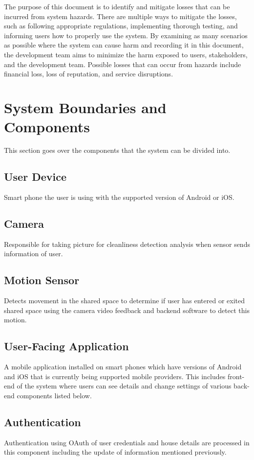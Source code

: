 \documentclass[12pt, titlepage]{article}
\begin{document}
The purpose of this document is to identify and mitigate losses that can be incurred from system hazards. There are multiple ways to mitigate the losses, such as following appropriate regulations, implementing thorough testing, and informing users how to properly use the system. By examining as many scenarios as possible where the system can cause harm and recording it in this document, the development team aims to minimize the harm exposed to users, stakeholders, and the development team. Possible losses that can occur from hazards include financial loss, loss of reputation, and service disruptions.      

\section{System Boundaries and Components}
This section goes over the components that the system can be divided into.

\subsection{User Device}
Smart phone the user is using with the supported version of Android or iOS.

\subsection{Camera}
Responsible for taking picture for cleanliness detection analysis when sensor sends information of user.

\subsection{Motion Sensor}
Detects movement in the shared space to determine if user has entered or exited shared space using the camera video feedback and backend software to detect this motion.

\subsection{User-Facing Application}
A mobile application installed on smart phones which have versions of Android and iOS that is currently being supported mobile providers. This includes front-end of the system where users can see details and change settings of various back-end components listed below.

\subsection{Authentication}
Authentication using OAuth of user credentials and house details are processed in this component including the update of information mentioned previously.
\end{document}
